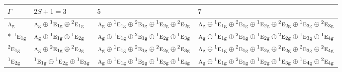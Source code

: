 \documentclass[10pt,a4paper]{article}
\numberwithin{equation}{section}
\newcommand{\irr}[1]{\text{\normalfont\scshape #1}}
\newcommand{\conjpair}[1]{{}^{#1}}
\newcommand{\ptag}[1]{\mathrm{#1}}
\begin{document}
{\small\setlength{\tabcolsep}{3pt}\begin{longtable}{@{}l>{\RaggedRight\arraybackslash}p{}>{\RaggedRight\arraybackslash}p{}>{\RaggedRight\arraybackslash}p{}@{}}\toprule
$\Gamma$ & $2S + 1 = 3$ & $5$ & $7$\\\midrule\endhead
\bottomrule\endfoot\endlastfoot
$\irr{a}_{\ptag{g}}$ & $\irr{a}_{\ptag{g}}\oplus \conjpair{1}\irr{e}_{1\ptag{g}}\oplus \conjpair{2}\irr{e}_{1\ptag{g}}$ & $\irr{a}_{\ptag{g}}\oplus \conjpair{1}\irr{e}_{1\ptag{g}}\oplus \conjpair{2}\irr{e}_{1\ptag{g}}\oplus \conjpair{1}\irr{e}_{2\ptag{g}}\oplus \conjpair{2}\irr{e}_{2\ptag{g}}$ & $\irr{a}_{\ptag{g}}\oplus \conjpair{1}\irr{e}_{1\ptag{g}}\oplus \conjpair{2}\irr{e}_{1\ptag{g}}\oplus \conjpair{1}\irr{e}_{2\ptag{g}}\oplus \conjpair{2}\irr{e}_{2\ptag{g}}\oplus \conjpair{1}\irr{e}_{3\ptag{g}}\oplus \conjpair{2}\irr{e}_{3\ptag{g}}$\\*
$\conjpair{1}\irr{e}_{1\ptag{g}}$ & $\irr{a}_{\ptag{g}}\oplus \conjpair{1}\irr{e}_{1\ptag{g}}\oplus \conjpair{1}\irr{e}_{2\ptag{g}}$ & $\irr{a}_{\ptag{g}}\oplus \conjpair{1}\irr{e}_{1\ptag{g}}\oplus \conjpair{2}\irr{e}_{1\ptag{g}}\oplus \conjpair{1}\irr{e}_{2\ptag{g}}\oplus \conjpair{1}\irr{e}_{3\ptag{g}}$ & $\irr{a}_{\ptag{g}}\oplus \conjpair{1}\irr{e}_{1\ptag{g}}\oplus \conjpair{2}\irr{e}_{1\ptag{g}}\oplus \conjpair{1}\irr{e}_{2\ptag{g}}\oplus \conjpair{2}\irr{e}_{2\ptag{g}}\oplus \conjpair{1}\irr{e}_{3\ptag{g}}\oplus \conjpair{1}\irr{e}_{4\ptag{g}}$\\
$\conjpair{2}\irr{e}_{1\ptag{g}}$ & $\irr{a}_{\ptag{g}}\oplus \conjpair{2}\irr{e}_{1\ptag{g}}\oplus \conjpair{2}\irr{e}_{2\ptag{g}}$ & $\irr{a}_{\ptag{g}}\oplus \conjpair{1}\irr{e}_{1\ptag{g}}\oplus \conjpair{2}\irr{e}_{1\ptag{g}}\oplus \conjpair{2}\irr{e}_{2\ptag{g}}\oplus \conjpair{2}\irr{e}_{3\ptag{g}}$ & $\irr{a}_{\ptag{g}}\oplus \conjpair{1}\irr{e}_{1\ptag{g}}\oplus \conjpair{2}\irr{e}_{1\ptag{g}}\oplus \conjpair{1}\irr{e}_{2\ptag{g}}\oplus \conjpair{2}\irr{e}_{2\ptag{g}}\oplus \conjpair{2}\irr{e}_{3\ptag{g}}\oplus \conjpair{2}\irr{e}_{4\ptag{g}}$\\
$\conjpair{1}\irr{e}_{2\ptag{g}}$ & $\conjpair{1}\irr{e}_{1\ptag{g}}\oplus \conjpair{1}\irr{e}_{2\ptag{g}}\oplus \conjpair{1}\irr{e}_{3\ptag{g}}$ & $\irr{a}_{\ptag{g}}\oplus \conjpair{1}\irr{e}_{1\ptag{g}}\oplus \conjpair{1}\irr{e}_{2\ptag{g}}\oplus \conjpair{1}\irr{e}_{3\ptag{g}}\oplus \conjpair{1}\irr{e}_{4\ptag{g}}$ & $\irr{a}_{\ptag{g}}\oplus \conjpair{1}\irr{e}_{1\ptag{g}}\oplus \conjpair{2}\irr{e}_{1\ptag{g}}\oplus \conjpair{1}\irr{e}_{2\ptag{g}}\oplus \conjpair{1}\irr{e}_{3\ptag{g}}\oplus \conjpair{1}\irr{e}_{4\ptag{g}}\oplus \conjpair{2}\irr{e}_{4\ptag{g}}$\\

\end{longtable}}
\end{document}
